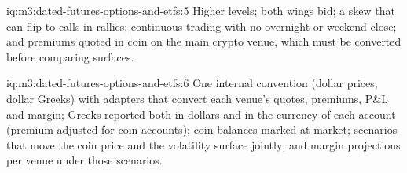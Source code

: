\begin{solution}{iq:m3:dated-futures-options-and-etfs:5}
Higher levels; both wings bid; a skew that can flip to calls in rallies; continuous trading with no overnight or weekend close; and
premiums quoted in coin on the main crypto venue, which must be converted before comparing surfaces.
\end{solution}

\begin{solution}{iq:m3:dated-futures-options-and-etfs:6}
One internal convention (dollar prices, dollar Greeks) with adapters that convert each venue's quotes, premiums, P\&L and margin; Greeks
reported both in dollars and in the currency of each account (premium-adjusted for coin accounts); coin balances marked at market;
scenarios that move the coin price and the volatility surface jointly; and margin projections per venue under those scenarios.
\end{solution}
